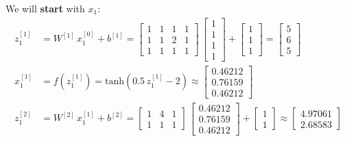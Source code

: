 \documentclass[12pt]{article}
\begin{document}
\begin{enumerate}[leftmargin=\labelsep]
        We will \textbf{start} with $x_1$:
        \begingroup
        \allowdisplaybreaks
        \begin{align*}
          z^{[1]}_1   & = {W}^{[1]} \, {x}^{[0]}_1 + {b}^{[1]} = \begin{bmatrix} 1 & 1 & 1 & 1 \\ 1 & 1 & 2 & 1 \\ 1 & 1 & 1 & 1\end{bmatrix} \,  \begin{bmatrix} 1 \\ 1 \\ 1 \\ 1 \end{bmatrix} +
          \begin{bmatrix} 1 \\ 1 \\ 1\end{bmatrix} = \begin{bmatrix} 5 \\ 6 \\ 5\end{bmatrix}                                                                                                      \\
          {x}^{[1]}_1 & = f\left({z}^{[1]}_1\right) = \text{tanh}\left(0.5\,{z}^{[1]}_1 - 2\right) \approx \begin{bmatrix} 0.46212 \\ 0.76159 \\ 0.46212\end{bmatrix}                              \\
          z^{[2]}_1   & = {W}^{[2]} \, {x}^{[1]}_1 + {b}^{[2]} = \begin{bmatrix} 1 & 4 & 1 \\ 1 & 1 & 1\end{bmatrix} \, \begin{bmatrix} 0.46212 \\ 0.76159 \\ 0.46212 \end{bmatrix} +
          \begin{bmatrix} 1 \\ 1\end{bmatrix} \approx \begin{bmatrix} 4.97061 \\ 2.68583\end{bmatrix}                                                                                              \\

\end{align*}
\end{enumerate}
\end{document}
